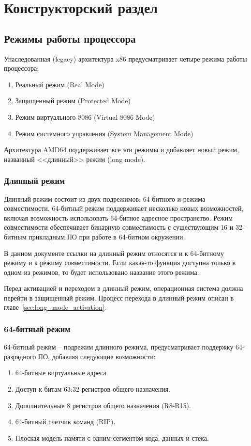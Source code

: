 \chapter{Конструкторский раздел}
\label{cha:design}

\section{Режимы работы процессора}
Унаследованная (legacy) архитектура x86 предусматривает четыре режима работы процессора:
\begin{enumerate}[1.]
	\item Реальный режим (Real Mode)
	\item Защищенный режим (Protected Mode)
	\item Режим виртуального 8086 (Virtual-8086 Mode)
	\item Режим системного управления (System Management Mode)
\end{enumerate}

Архитектура AMD64 поддерживает все эти режимы и добавляет новый режим,
названный <<длинный>> режим (long mode).

\subsection{Длинный режим}
Длинный режим состоит из двух подрежимов: 64-битного и режима совместимости.
64-битный режим поддерживает несколько новых возможностей, включая возможность
использовать 64-битное адресное пространство. Режим совместимости обеспечивает
бинарную совместимость с существующим 16 и 32-битным прикладным ПО при работе
в 64-битном окружении.

В данном документе ссылки на длинный режим относятся и к 64-битному режиму и к
режиму совместимости. Если какая-то функция доступна только в одном из режимов,
то будет использовано название этого режима.

Перед активацией и переходом в длинный режим, операционная система должна перейти в
защищенный режим. Процесс перехода в длинный режим описан в главе~\ref{sec:long_mode_activation}.

\subsection{64-битный режим}
64-битный режим -- подрежим длинного режима, предусматривает поддержку 64-разрядного
ПО, добавляя следующие возможности:
\begin{enumerate}[1.]
\item 64-битные виртуальные адреса.
\item Доступ к битам 63:32 регистров общего назначения.
\item Дополнительные 8 регистров общего назначения (R8-R15).
\item 64-битный счетчик команд (RIP).
\item Плоская модель памяти с одним сегментом кода, данных и стека.
\end{enumerate}

